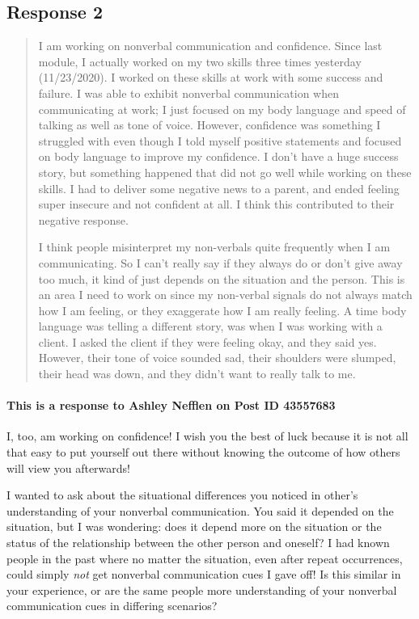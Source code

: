 
\subsection{Response 2}
  \begin{quotation}
    I am working on nonverbal communication and confidence. Since last module,
      I actually worked on my two skills three times yesterday (11/23/2020). I
      worked on these skills at work with some success and failure. I was able
      to exhibit nonverbal communication when communicating at work; I just
      focused on my body language and speed of talking as well as tone of voice.
      However, confidence was something I struggled with even though I told
      myself positive statements and focused on body language to improve my
      confidence. I don’t have a huge success story, but something happened
      that did not go well while working on these skills. I had to deliver some
      negative news to a parent, and ended feeling super insecure and not
      confident at all. I think this contributed to their negative response.

    I think people misinterpret my non-verbals quite frequently when I am
      communicating. So I can’t really say if they always do or don’t give away
      too much, it kind of just depends on the situation and the person. This
      is an area I need to work on since my non-verbal signals do not always
      match how I am feeling, or they exaggerate how I am really feeling. A time
      body language was telling a different story, was when I was working with a
      client. I asked the client if they were feeling okay, and they said yes.
      However, their tone of voice sounded sad, their shoulders were slumped,
      their head was down, and they didn’t want to really talk to me.
  \end{quotation}

  \paragraph{This is a response to Ashley Nefflen on Post ID 43557683}
    I, too, am working on confidence! I wish you the best of luck because it
      is not all that easy to put yourself out there without knowing the outcome
      of how others will view you afterwards!

    I wanted to ask about the situational differences you noticed in other's
      understanding of your nonverbal communication. You said it depended on
      the situation, but I was wondering: does it depend more on the situation
      or the status of the relationship between the other person and oneself?
      I had known people in the past where no matter the situation, even after
      repeat occurrences, could simply \textit{not} get nonverbal communication
      cues I gave off! Is this similar in your experience, or are the same
      people more understanding of your nonverbal communication cues in
      differing scenarios?
